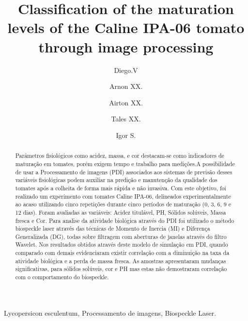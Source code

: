 \documentclass{elsarticle}
\begin{document}
\begin{frontmatter}

\title{Classification of the maturation levels of the Caline IPA-06 tomato through image processing} 

\author[First]{Diego.V} 
\author[Second]{Arnon XX.}
\author[Room]{Airton XX.}
\author[Third]{Tales XX.}
\author[Fifth]{Igor S.}


\address[First]{Universidade Federal de Sergipe, SE 49100-000 BR (e-mail: vidal.center@academico.ufs.br);}
\address[Second]{Universidade Federal de Sergipe, SE 49100-000 BR (e-mail: xxxxxx@xxxxx.com);}
\address[Room]{Universidade Federal de Sergipe, SE 49100-000 BR (e-mail:  xxxxxx@xxxxx.com);}
\address[Third]{Universidade Federal de Sergipe, SE 49100-000 BR (e-mail:  xxxxxx@xxxxx.com;}
\address[Fifth]{Universidade Federal de Sergipe, SE 49100-000 BR (e-mail:  xxxxxx@xxxxx.com).}


\begin{abstract}%
Parâmetros fisiológicos como acidez, massa, e cor destacam-se como indicadores de maturação em tomates, porém exigem tempo e trabalho para medições.A possibilidade de usar a Processamento de imagens (PDI) associados aos sistemas de previsão desses
variáveis fisiológicas podem auxiliar na predição e manutenção da qualidade dos tomates após a colheita de forma mais rápida e não invasiva. Com este objetivo, foi realizado um experimento com tomates Caline IPA-06, delineados experimentalmente ao acaso utilizando cinco repetições durante cinco períodos de maturação (0, 3, 6, 9 e 12 dias). Foram avaliadas as variáveis: Acidez titulável, PH, Sólidos solúveis, Massa fresca e Cor. Para analise da atividade biológica através do PDI foi utilizado o método biospeckle laser através das técnicas de Momento de Inercia (MI) e Diferença Generalizada (DG), todas sobre filtragem com aberturas de janelas através do filtro Wavelet. 
Nos resultados obtidos através deste modelo de simulação em PDI, quando comparado com demais evidenciaram existir correlação com a diminuição na taxa da atividade biológica e a perda de massa fresca. As amostras apresentaram mudanças significativas, para sólidos solúveis, cor  e PH mas estas não demostraram correlação com o comportamento do biospeckle.
\end{abstract}
\begin{keyword}
Lycopersicon esculentum, Processamento de imagens, Biospeckle Laser.
\end{keyword}
\end{frontmatter}
\end{document}
